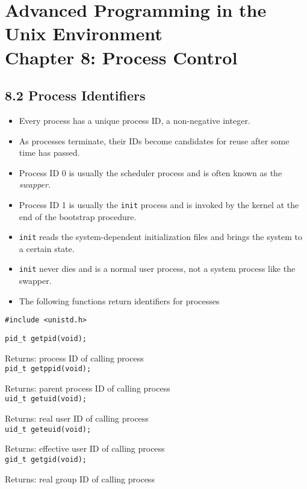 \documentclass[]{article}
\newcommand{\code}{\texttt}
\begin{document}
\section*{Advanced Programming in the Unix Environment \\
Chapter 8: Process
Control}
\subsection*{8.2 Process Identifiers}
\begin{itemize}
\item Every process has a unique process ID, a non-negative integer.
\item As processes terminate, their IDs become candidates for reuse after some
time has passed.
\item Process ID 0 is usually the scheduler process and is often known as the
\emph{swapper}.
\item Process ID 1 is usually the \code{init} process and is invoked by the
kernel at the end of the bootstrap procedure.
\item \code{init} reads the system-dependent initialization files and brings the
system to a certain state.
\item \code{init} never dies and is a normal user process, not a system process
like the swapper.
\item The following functions return identifiers for processes
\end{itemize}

\code{\#include <unistd.h>}

\code{pid\_t getpid(void);}

Returns: process ID of calling process\\

\code{pid\_t getppid(void);}

Returns: parent process ID of calling process\\

\code{uid\_t getuid(void);}

Returns: real user ID of calling process\\

\code{uid\_t geteuid(void);}

Returns: effective user ID of calling process \\

\code{gid\_t getgid(void);}

Returns: real group ID of calling process\\
\end{document}
